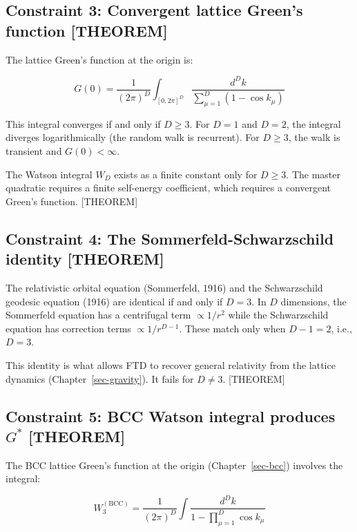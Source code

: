 \documentclass[
  11pt,
  letterpaper,
  twoside,
  openany]{book}
\makeatletter
\let\orig@subsection\subsection
\renewcommand{\subsection}{\needspace{6\baselineskip}\orig@subsection}
\newcommand{\Gs}{G^{*}{}}
\makeatother
\begin{document}
\subsection{Constraint 3: Convergent lattice Green's function
{[}THEOREM{]}}\label{constraint-3-convergent-lattice-greens-function-theorem}

The lattice Green's function at the origin is:

\[
G(0) = \frac{1}{(2\pi)^D} \int_{[0,2\pi]^D} \frac{d^D k}{\sum_{\mu=1}^D (1 - \cos k_\mu)}
\]

This integral converges if and only if \(D \geq 3\). For \(D = 1\) and
\(D = 2\), the integral diverges logarithmically (the random walk is
recurrent). For \(D \geq 3\), the walk is transient and
\(G(0) < \infty\).

The Watson integral \(W_D\) exists as a finite constant only for
\(D \geq 3\). The master quadratic requires a finite self-energy
coefficient, which requires a convergent Green's function. {[}THEOREM{]}

\subsection{Constraint 4: The Sommerfeld-Schwarzschild identity
{[}THEOREM{]}}\label{constraint-4-the-sommerfeld-schwarzschild-identity-theorem}

The relativistic orbital equation (Sommerfeld, 1916) and the
Schwarzschild geodesic equation (1916) are identical if and only if
\(D = 3\). In \(D\) dimensions, the Sommerfeld equation has a
centrifugal term \(\propto 1/r^2\) while the Schwarzschild equation has
correction terms \(\propto 1/r^{D-1}\). These match only when
\(D - 1 = 2\), i.e., \(D = 3\).

This identity is what allows FTD to recover general relativity from the
lattice dynamics (Chapter~\ref{sec-gravity}). It fails for \(D \neq 3\).
{[}THEOREM{]}

\subsection{\texorpdfstring{Constraint 5: BCC Watson integral produces
\(\Gs\)
{[}THEOREM{]}}{Constraint 5: BCC Watson integral produces \textbackslash Gs {[}THEOREM{]}}}\label{constraint-5-bcc-watson-integral-produces-gs-theorem}

The BCC lattice Green's function at the origin (Chapter~\ref{sec-bcc})
involves the integral:

\[
W_3^{(\text{BCC})} = \frac{1}{(2\pi)^D} \int \frac{d^D k}{1 - \prod_{\mu=1}^D \cos k_\mu}
\]
\end{document}
